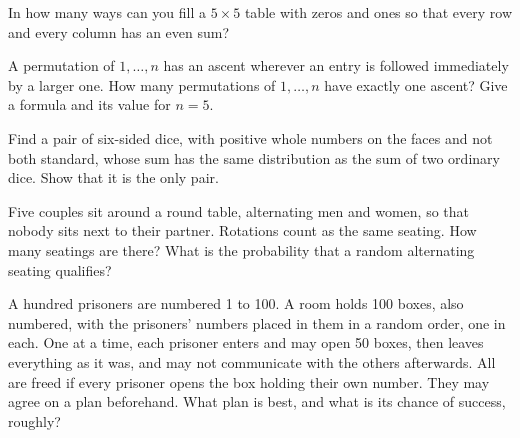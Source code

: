 \begin{question}\label{iq:iv1:counting-and-symmetry:36}
In how many ways can you fill a $5 \times 5$ table with zeros and ones so that every row and every column has an even sum?
\end{question}

\begin{question}\label{iq:iv1:counting-and-symmetry:37}
A permutation of $1, \dots, n$ has an ascent wherever an entry is followed immediately by a larger one. How many permutations of $1, \dots, n$ have exactly one ascent? Give a formula and its value for $n = 5$.
\end{question}

\begin{question}\label{iq:iv1:counting-and-symmetry:38}
Find a pair of six-sided dice, with positive whole numbers on the faces and not both standard, whose sum has the same distribution as the sum of two ordinary dice. Show that it is the only pair.
\end{question}

\begin{question}\label{iq:iv1:counting-and-symmetry:39}
Five couples sit around a round table, alternating men and women, so that nobody sits next to their partner. Rotations count as the same seating. How many seatings are there? What is the probability that a random alternating seating qualifies?
\end{question}

\begin{question}\label{iq:iv1:counting-and-symmetry:40}
A hundred prisoners are numbered 1 to 100. A room holds 100 boxes, also numbered, with the prisoners' numbers placed in them in a random order, one in each. One at a time, each prisoner enters and may open 50 boxes, then leaves everything as it was, and may not communicate with the others afterwards. All are freed if every prisoner opens the box holding their own number. They may agree on a plan beforehand. What plan is best, and what is its chance of success, roughly?
\end{question}
